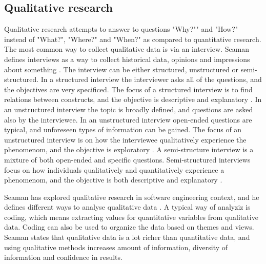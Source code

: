 \documentclass[english, grading]{tktltiki2}
\theoremstyle{definition}
\theoremstyle{remark}
\begin{document}
\subsection{Qualitative research}
Qualitative research attempts to answer to questions "Why?"" and "How?" instead of "What?", "Where?" and "When?" as compared to quantitative research. The most common way to collect qualitative data is via an interview. Seaman defines interviews as a way to collect historical data, opinions and impressions about something \cite{seaman1999qualitative}. The interview can be either structured, unstructured or semi-structured. In a structured interview the interviewer asks all of the questions, and the objectives are very specificed. The focus of a structured interview is to find relations between constructs, and the objective is descriptive and explanatory \cite{runeson2009guidelines}. In an unstructured interview the topic is broadly defined, and questions are asked also by the interviewee. In an unstructured interview open-ended questions are typical, and unforeseen types of information can be gained. The focus of an unstructured interview is on how the interviewee qualitatively experience the phenomenom, and the objective is exploratory \cite{runeson2009guidelines}. A semi-structure interview is a mixture of both open-ended and specific questions. Semi-structured interviews focus on how individuals qualitatively and quantitatively experience a phenomenom, and the objective is both descriptive and explanatory \cite{runeson2009guidelines}.

Seaman has explored qualitative research in software engineering context, and he defines different ways to analyse qualitative data \cite{seaman1999qualitative}. A typical way of analyziz is coding, which means extracting values for quantitative variables from qualitative data. Coding can also be used to organize the data based on themes and views. Seaman states that qualitative data is a lot richer than quantitative data, and using qualitative methods increases amount of information, diversity of information and confidence in results. 
\end{document}
